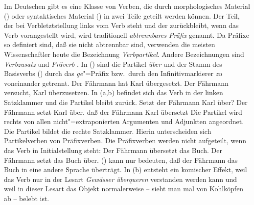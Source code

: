 Im Deutschen gibt es eine Klasse von Verben, die durch
morphologisches Material () oder syntaktisches
Material () in zwei Teile geteilt werden können. 
Der Teil, der bei Verbletztstellung links vom Verb steht und
der zurückbleibt, wenn das Verb vorangestellt wird, wird
traditionell \emph{abtrennbares Präfix} genannt. Da Präfixe
so definiert sind, daß sie nicht abtrennbar sind, verwenden
die meisten Wissenschaftler heute die Bezeichnung \emph{Verbpartikel}.
Andere Bezeichnungen sind \emph{Verbzusatz} und \emph{Präverb} \citep[]{Jung67a}.
In () sind die Partikel \emph{über} und der Stamm des Basisverbs ()
durch das \emph{ge}"=Präfix bzw.\ durch den Infinitivmarkierer \emph{zu} voneinander getrennt.
\eal
\ex{}
Der Fährmann hat Karl übergesetzt.
\ex
Der Fährmann versucht, Karl überzusetzen.
\zl
In (a,b) befindet sich das Verb in der linken Satzklammer und die Partikel bleibt zurück.
\eal
\ex
Setzt der Fährmann Karl über?
\ex
Der Fährmann setzt Karl über.
\label{ex-setzt-ueber}
\ex
daß der Fährmann Karl übersetzt
\zl
Die Partikel wird rechts von allen nicht"=extraponierten Argumenten und Adjunkten
angeordnet. Die Partikel bildet die rechte Satzklammer. Hierin unterscheiden sich Partikelverben
von Präfixverben. Die Präfixverben werden nicht aufgeteilt, wenn das Verb in Initialstellung
steht:
\eal
\ex Der Fährmann übersetzt das Buch.
\ex Der Fährmann setzt das Buch über.
\zl
() kann nur bedeuten, daß der Fährmann das Buch in eine andere Sprache überträgt.
In (b) entsteht ein komischer Effekt, weil das Verb nur in der Lesart \emph{Gewässer überqueren}
verstanden werden kann und weil in dieser Lesart das Objekt normalerweise -- sieht man mal von Kohlköpfen ab --
belebt ist.

